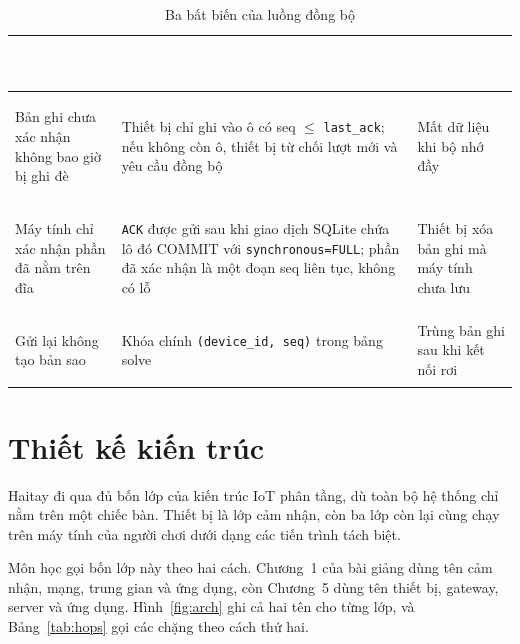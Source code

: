 \begin{table}[H]
    \centering
    \renewcommand{\arraystretch}{1.45}
    \caption{Ba bất biến của luồng đồng bộ}
    \label{tab:invariants}
    \begin{tabular}{>{\bfseries\raggedright\arraybackslash}m{4.4cm} >{\raggedright\arraybackslash}m{5.4cm} >{\raggedright\arraybackslash}m{4.4cm}}
        \toprule
        \rowcolor{haitayblue}
        \textcolor{white}{Bất biến} & \textcolor{white}{Cơ chế duy nhất bảo đảm} & \textcolor{white}{Lỗi mà nó chặn} \\
        \midrule
        \rowcolor{haitayblue!8}
        Bản ghi chưa xác nhận không bao giờ bị ghi đè & Thiết bị chỉ ghi vào ô có seq $\le$ \texttt{last\_ack}; nếu không còn ô, thiết bị từ chối lượt mới và yêu cầu đồng bộ & Mất dữ liệu khi bộ nhớ đầy \\
        Máy tính chỉ xác nhận phần đã nằm trên đĩa & \texttt{ACK} được gửi sau khi giao dịch SQLite chứa lô đó COMMIT với \texttt{synchronous=FULL}; phần đã xác nhận là một đoạn seq liên tục, không có lỗ & Thiết bị xóa bản ghi mà máy tính chưa lưu \\
        \rowcolor{haitayblue!8}
        Gửi lại không tạo bản sao & Khóa chính \texttt{(device\_id, seq)} trong bảng solve & Trùng bản ghi sau khi kết nối rơi \\
        \bottomrule
    \end{tabular}
\end{table}

\section{Thiết kế kiến trúc}
\label{sec:arch}
Haitay đi qua đủ bốn lớp của kiến trúc IoT phân tầng, dù toàn bộ hệ thống chỉ nằm trên một chiếc bàn. Thiết bị là lớp cảm nhận, còn ba lớp còn lại cùng chạy trên máy tính của người chơi dưới dạng các tiến trình tách biệt.

Môn học gọi bốn lớp này theo hai cách. Chương~1 của bài giảng dùng tên cảm nhận, mạng, trung gian và ứng dụng, còn Chương~5 dùng tên thiết bị, gateway, server và ứng dụng. Hình~\ref{fig:arch} ghi cả hai tên cho từng lớp, và Bảng~\ref{tab:hops} gọi các chặng theo cách thứ hai.

